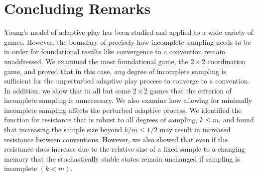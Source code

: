 
\section{Concluding Remarks}

Young's model of adaptive play has been studied and applied to a wide variety of games. However, the boundary of precisely how incomplete sampling needs to be in order for foundational results like convergence to a convention remain unaddressed. We examined the most foundational game, the $2\times 2$ coordination game, and proved that in this case, \textit{any} degree of incomplete sampling is sufficient for the unperturbed adaptive play process to converge to a convention. In addition, we show that in all but some $2 \times 2$ games that the criterion of incomplete sampling is unnecessary. We also examine how allowing for minimally incomplete sampling affects the perturbed adaptive process. We identified the function for resistance that is robust to all degrees of sampling, $k \leq m$, and found that increasing the sample size beyond $k/m \leq 1/2$ may result in increased resistance between conventions. However, we also showed that even if the resistance does increase due to the relative size of a fixed sample to a changing memory that the stochastically stable states remain unchanged if sampling is incomplete $(k<m)$.

